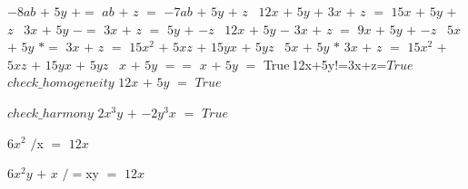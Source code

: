 \documentclass{\SetClass}
\begin{document}
$-8ab$ $+$ $5y$ $+=$ $ab$ $+$ $z$ $=$ $-7ab$ $+$ $5y$ $+$ $z$
\
$12x$ $+$ $5y$ $+$ $3x$ $+$ $z$ $=$ $15x$ $+$ $5y$ $+$ $z$
\
$3x$ $+$ $5y$ $-=$ $3x$ $+$ $z$ $=$ $5y$ $+$ $-z$
\
$12x$ $+$ $5y$ $-$ $3x$ $+$ $z$ $=$ $9x$ $+$ $5y$ $+$ $-z$
\
$5x$ $+$ $5y$ $*=$ $3x$ $+$ $z$ $=$ $15x^2$ $+$ $5xz$ $+$ $15yx$ $+$ $5yz$
\
$5x$ $+$ $5y$ $*$ $3x$ $+$ $z$ $=$ $15x^2$ $+$ $5xz$ $+$ $15yx$ $+$ $5yz$
\
$x$ $+$ $5y$ $==$ $x$ $+$ $5y$ $=$ True$
\
$12x$ $+$ $5y$ $!=$ $3x$ $+$ $z$ $=$ True$
\
$check\_homogeneity$ $12x$ $+$ $5y$ $=$ $True$
\par
$check\_harmony$ $2x^3y$ $+$ $-2y^3x$ $=$ $True$
\par
$6x^2$ $/$x $=$ $12x$
\par
$6x^2y$ $+$ $x$ $/=$xy $=$ $12x$
\par
\end{document}
